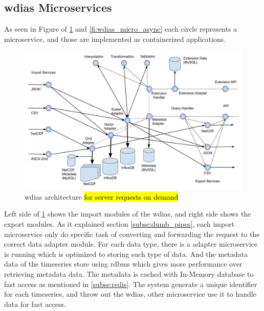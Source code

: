 \subsection{\acrshort{wdias} Microservices}
\label{sebse:wdias_microservices}
As seen in Figure of \cref{fi:wdias_micro_on_demand} and \cref{fi:wdias_micro_async} each circle represents a microservice, and those are implemented as containerized applications.
\begin{figure}[htp]
    \centering
    \includegraphics[width=1\textwidth]{method/microservice/microservice_architecture-handle_on_demand-v3.jpg}
    \caption{\acrshort{wdias} architecture \hl{for server requests on demand}}
    \label{fi:wdias_micro_on_demand}
\end{figure}
Left side of \cref{fi:wdias_micro_on_demand} shows the import modules of the \acrshort{wdias}, and right side shows the export modules. As it explained section \cref{subse:dumb_pipes}, each import microservice only do specific task of converting and forwarding the request to the correct data adapter module.
For each data type, there is a adapter microservice is running which is optimized to storing such type of data. And the metadata data of the timeseries store using \acrshort{rdbms} which gives more performance over retrieving metadata data. The metadata is cached with In-Memory database to fast access as mentioned in \cref{subse:redis}.
The system generate a unique identifier for each timeseries, and throw out the \acrshort{wdias}, other microservice use it to handle data for fast access.

